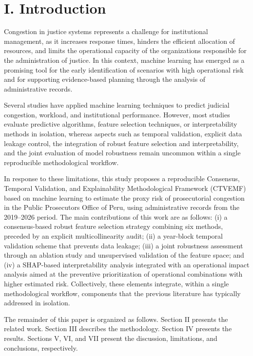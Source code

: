 \documentclass[
  number]{elsarticle}
\begin{document}
\section{I. Introduction}\label{i.-introduction}

Congestion in justice systems represents a challenge for institutional
management, as it increases response times, hinders the efficient
allocation of resources, and limits the operational capacity of the
organizations responsible for the administration of justice. In this
context, machine learning has emerged as a promising tool for the early
identification of scenarios with high operational risk and for
supporting evidence-based planning through the analysis of
administrative records.

Several studies have applied machine learning techniques to predict
judicial congestion, workload, and institutional performance. However,
most studies evaluate predictive algorithms, feature selection
techniques, or interpretability methods in isolation, whereas aspects
such as temporal validation, explicit data leakage control, the
integration of robust feature selection and interpretability, and the
joint evaluation of model robustness remain uncommon within a single
reproducible methodological workflow.

In response to these limitations, this study proposes a reproducible
Consensus, Temporal Validation, and Explainability Methodological
Framework (CTVEMF) based on machine learning to estimate the proxy risk
of prosecutorial congestion in the Public Prosecutor\textquotesingle s
Office of Peru, using administrative records from the 2019--2026 period.
The main contributions of this work are as follows: (i) a
consensus-based robust feature selection strategy combining six methods,
preceded by an explicit multicollinearity audit; (ii) a year-block
temporal validation scheme that prevents data leakage; (iii) a joint
robustness assessment through an ablation study and unsupervised
validation of the feature space; and (iv) a SHAP-based interpretability
analysis integrated with an operational impact analysis aimed at the
preventive prioritization of operational combinations with higher
estimated risk. Collectively, these elements integrate, within a single
methodological workflow, components that the previous literature has
typically addressed in isolation.

The remainder of this paper is organized as follows. Section II presents
the related work. Section III describes the methodology. Section IV
presents the results. Sections V, VI, and VII present the discussion,
limitations, and conclusions, respectively.
\end{document}
